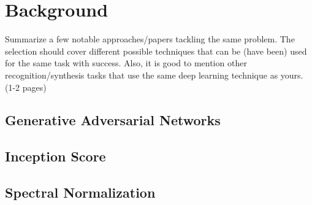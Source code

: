 
\section{Background}
Summarize a few notable approaches/papers tackling
the same problem. The selection should cover different possible techniques
that can be (have been) used for the same task with success.
Also, it is good to mention other recognition/synthesis tasks that use
the same deep learning technique as yours. (1-2 pages)

\subsection{Generative Adversarial Networks}

\subsection{Inception Score}

\subsection{Spectral Normalization}



